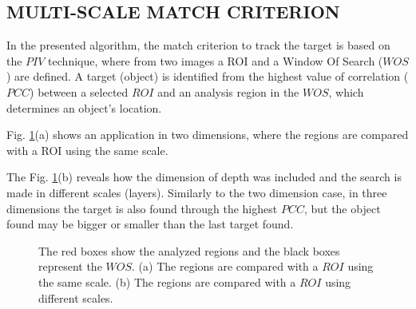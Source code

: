 
\subsection{MULTI-SCALE MATCH CRITERION}
In the presented algorithm, the match criterion to track the target is based on the $PIV$ technique, 
where from two images a ROI and a Window Of Search ($WOS$) are defined. A target (object) is identified 
from the highest value of correlation ($PCC$) between a selected $ROI$ and an analysis region in the $WOS$,
which determines an object's location.

Fig. \ref{fig:multires}(a) shows an application in two dimensions, where
the regions are compared with a ROI using the same scale.

The Fig. \ref{fig:multires}(b) reveals how the dimension of depth was included and
the search is made in different scales (layers). Similarly to the two dimension case, 
in three dimensions the target is also found through the highest $PCC$, but the object found may be 
bigger or smaller than the last target found.

\begin{figure}[H]
\centering
  \caption{The red boxes show the analyzed regions and the black boxes represent the $WOS$. 
  (a) The regions are compared with a $ROI$ using the same scale. 
  (b) The regions are compared with a $ROI$ using different scales.}
  \label{fig:multires}
\end{figure}




